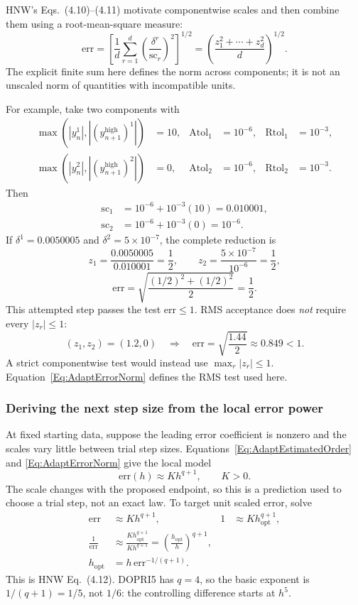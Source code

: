 HNW's Eqs.~(4.10)--(4.11) motivate componentwise scales and then combine them
using a root-mean-square measure:
\begin{equation}\label{Eq:AdaptErrorNorm}
 \mathrm{err}
 =\left[\frac1d\sum_{r=1}^d
        \left(\frac{\delta^r}{\mathrm{sc}_r}\right)^2\right]^{1/2}
 =\left(\frac{z_1^2+\cdots+z_d^2}{d}\right)^{1/2}.
\end{equation}
The explicit finite sum here defines the norm across components; it is not
an unscaled norm of quantities with incompatible units.

For example, take two components with
\[
\begin{aligned}
 \max(|y_n^1|,|(y_{n+1}^{\mathrm{high}})^1|)&=10,
 &\mathrm{Atol}_1&=10^{-6},&\mathrm{Rtol}_1&=10^{-3},\\
 \max(|y_n^2|,|(y_{n+1}^{\mathrm{high}})^2|)&=0,
 &\mathrm{Atol}_2&=10^{-6},&\mathrm{Rtol}_2&=10^{-3}.
\end{aligned}
\]
Then
\[
\begin{aligned}
 \mathrm{sc}_1&=10^{-6}+10^{-3}(10)=0.010001,\\
 \mathrm{sc}_2&=10^{-6}+10^{-3}(0)=10^{-6}.
\end{aligned}
\]
If $\delta^1=0.0050005$ and $\delta^2=5\times10^{-7}$, the complete reduction is
\[
 z_1=\frac{0.0050005}{0.010001}=\frac12,\qquad
 z_2=\frac{5\times10^{-7}}{10^{-6}}=\frac12,
\]
\[
 \mathrm{err}=\sqrt{\frac{(1/2)^2+(1/2)^2}{2}}=\frac12.
\]
This attempted step passes the test $\mathrm{err}\leq1$.
RMS acceptance does \emph{not} require every $|z_r|\leq1$:
\[
 (z_1,z_2)=(1.2,0)
 \quad\Longrightarrow\quad
 \mathrm{err}=\sqrt{\frac{1.44}{2}}\approx0.849<1.
\]
A strict componentwise test would instead use $\max_r|z_r|\leq1$.
Equation~\ref{Eq:AdaptErrorNorm} defines the RMS test used here.

\subsubsection{Deriving the next step size from the local error power}
At fixed starting data, suppose the leading error coefficient is nonzero and
the scales vary little between trial step sizes. Equations~\ref{Eq:AdaptEstimatedOrder}
and \ref{Eq:AdaptErrorNorm} give the local model
\[
 \mathrm{err}(h)\approx K h^{q+1},\qquad K>0.
\]
The scale changes with the proposed endpoint, so this is a prediction used to
choose a trial step, not an exact law. To target unit scaled error, solve
\begin{equation}\label{Eq:AdaptOptimalStep}
\begin{aligned}
 \mathrm{err}&\approx K h^{q+1},
 &1&\approx K h_{\mathrm{opt}}^{q+1},\\
 \frac1{\mathrm{err}}&\approx
       \frac{K h_{\mathrm{opt}}^{q+1}}{K h^{q+1}}
       =\left(\frac{h_{\mathrm{opt}}}{h}\right)^{q+1},\\
 h_{\mathrm{opt}}&=h\,\mathrm{err}^{-1/(q+1)}.
\end{aligned}
\end{equation}
This is HNW Eq.~(4.12). DOPRI5 has $q=4$, so the basic exponent is
$1/(q+1)=1/5$, not $1/6$: the controlling difference starts at $h^5$.

